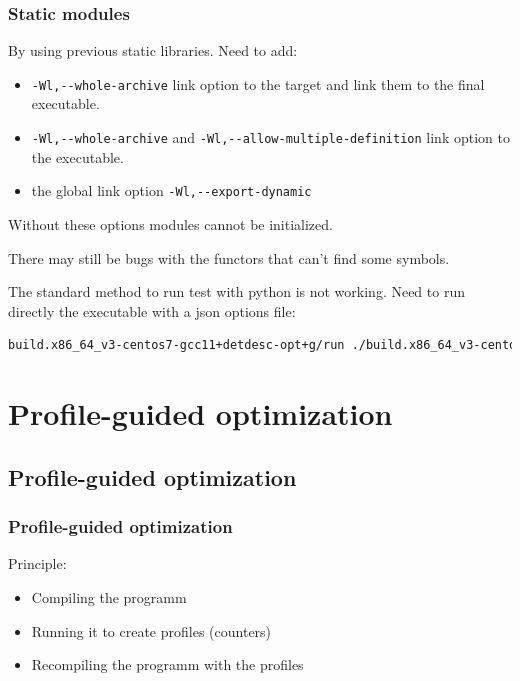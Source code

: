 \documentclass{beamer}
\begin{document}
    \begin{frame}[fragile]
        \frametitle{Static modules}

        By using previous static libraries.
        Need to add:
        \begin{itemize}
            \item \verb'-Wl,--whole-archive' link option to the target and link them to the final executable.
            \item \verb'-Wl,--whole-archive' and \verb'-Wl,--allow-multiple-definition' link option to the executable.
            \item the global link option \verb'-Wl,--export-dynamic'
        \end{itemize}
        Without these options modules cannot be initialized.

        There may still be bugs with the functors that can't find some symbols.
    \end{frame}

    \begin{frame}[fragile]
        The standard method to run test with python is not working. Need to run directly the executable with a json options file:
        \begin{lstlisting}[language=bash,basicstyle=\scriptsize,breaklines]
            build.x86_64_v3-centos7-gcc11+detdesc-opt+g/run ./build.x86_64_v3-centos7-gcc11+detdesc-opt+g/Gaudi/Gaudi/Gaudi_static options.json
        \end{lstlisting}
    \end{frame}

\section{Profile-guided optimization}

    \subsection{Profile-guided optimization}

    \begin{frame}
        \frametitle{Profile-guided optimization}

        Principle:
        \begin{itemize}
            \item Compiling the programm
            \item Running it to create profiles (counters)
            \item Recompiling the programm with the profiles
        \end{itemize}
    \end{frame}
\end{document}
